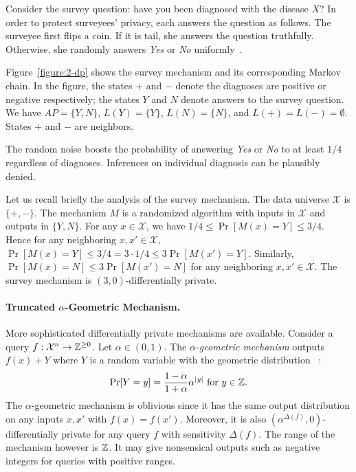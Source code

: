 Consider the survey question: have you been diagnosed
with the disease $X$? In order to protect surveyees' privacy, each
answers the question as follows. The surveyee first flips a
coin. If it is tail, she answers the question truthfully. Otherwise,
she randomly answers \textit{Yes} or \textit{No}
uniformly~\cite{DR:14:AFDP}. 

\begin{example}\label{exa:survey}
  Figure~\ref{figure:2-dp} shows the survey
mechanism and its corresponding Markov chain. In the figure, the states
$+$ and $-$ denote the diagnoses are positive or negative
respectively; the states $Y$ and $N$ denote answers to the survey
question. We have $AP=\{Y,N\}$, $L(Y)=\{Y\}$, $L(N)=\{N\}$, and $L(+)=L(-)=\emptyset$. States $+$ and $-$ are neighbors.

The random noise boosts the probability of answering
\textit{Yes} or \textit{No} to at least $1/4$ regardless of
diagnoses. Inferences on individual diagnosis can be plausibly denied.
\end{example}

Let us recall briefly the analysis of the survey mechanism. The data universe
$\mathcal{X}$ is $\{ +, - \}$. The mechanism $M$ is a randomized
algorithm with inputs in $\mathcal{X}$ and outputs in $\{ Y, N
\}$. For any $x \in \mathcal{X}$, we have $1/4 \leq \Pr[M(x) = Y] \leq
3/4$. Hence for any neighboring $x, x' \in \mathcal{X}$, $\Pr[M(x) =
Y] \leq 3/4 = 3 \cdot 1/4 \leq 3 \Pr[M (x') =
Y]$. Similarly, $\Pr[M (x) = N] \leq 3 \Pr[M (x') = N]$ for any
neighboring $x, x' \in \mathcal{X}$. The survey mechanism is
$(3, 0)$-differentially private.

\paragraph{Truncated $\alpha$-Geometric Mechanism.}
More sophisticated differentially private mechanisms are
available. Consider a query
$f : \mathcal{X}^n \rightarrow \mathbb{Z}^{\geq 0}$. Let $\alpha \in (0, 1)$.
The \emph{$\alpha$-geometric mechanism}
outputs $f(x) + Y$ where $Y$ is a random variable with the geometric
distribution~\cite{GRS:09:UUPM,GRS:12:UUPM} :
\[
\Pr[Y = y] = \frac{1 - \alpha}{1 + \alpha}\alpha^{|y|}
\textmd{ for } y \in \mathbb{Z}.
\]
The $\alpha$-geometric mechanism is oblivious since it has the same
output distribution on any inputs $x, x'$ with $f (x) = f
(x')$. Moreover, it is also $(\alpha^{\Delta (f)}, 0)$-differentially
private for any query $f$ with sensitivity $\Delta (f)$. The range of
the mechanism
however is $\mathbb{Z}$. It may give nonsensical outputs such as
negative integers for queries with positive ranges.

